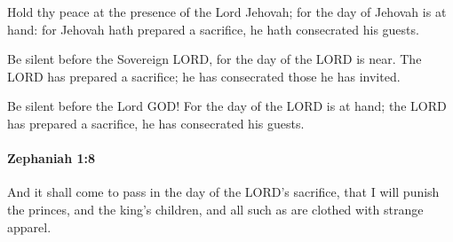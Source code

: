 			\begin{versebox}
					\item[BHS] 
					\item[LXX] 
					\item[ASV] Hold thy peace at the presence of the Lord Jehovah; for the day of Jehovah is at hand: for Jehovah hath prepared a sacrifice, he hath consecrated his guests.
					\item[NIV] Be silent before the Sovereign LORD, for the day of the LORD is near. The LORD has prepared a sacrifice; he has consecrated those he has invited.
					\item[NRSV] Be silent before the Lord GOD! For the day of the LORD is at hand; the LORD has prepared a sacrifice, he has consecrated his guests.
			\end{versebox}

		\paragraph{Zephaniah 1:8} %
			\label{ZEPHANIAH-1-8}

			And it shall come to pass in the day of the LORD’s sacrifice, that I will punish the princes, and the king’s children, and all such as are clothed with strange apparel.

